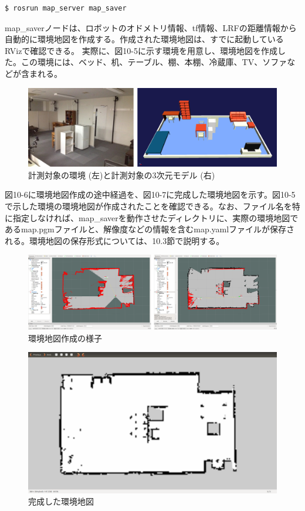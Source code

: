 \begin{lstlisting}[language=ROS]
$ rosrun map_server map_saver
\end{lstlisting}

map\_saverノードは、ロボットのオドメトリ情報、tf情報、LRFの距離情報から自動的に環境地図を作成する。作成された環境地図は、すでに起動しているRVizで確認できる。
実際に、図10-5に示す環境を用意し、環境地図を作成した。この環境には、ベッド、机、テーブル、棚、本棚、冷蔵庫、TV、ソファなどが含まれる。

\begin{figure}[htp]
  \centering
  \includegraphics[width=\columnwidth]{pictures/chapter10/pic_10_05.png}
  \caption{計測対象の環境 (左)と計測対象の3次元モデル (右)}
\end{figure}

図10-6に環境地図作成の途中経過を、図10-7に完成した環境地図を示す。図10-5で示した環境の環境地図が作成されたことを確認できる。なお、ファイル名を特に指定しなければ、map\_saverを動作させたディレクトリに、実際の環境地図であるmap.pgmファイルと、解像度などの情報を含むmap.yamlファイルが保存される。環境地図の保存形式については、10.3節で説明する。

\begin{figure}[htp]
  \centering
  \includegraphics[width=\columnwidth]{pictures/chapter10/pic_10_06.png}
  \caption{環境地図作成の様子}
\end{figure}

\begin{figure}[htp]
  \centering
  \includegraphics[width=\columnwidth]{pictures/chapter10/pic_10_07.png}
  \caption{完成した環境地図}
\end{figure}

